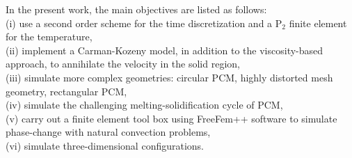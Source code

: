 In the present work, the main objectives are listed as follows:\\
(i) use a second order scheme for the time discretization and a P$_2$ finite element for the temperature,\\
(ii) implement a Carman-Kozeny model, in addition to the viscosity-based approach, to annihilate the velocity in the solid region,\\
(iii) simulate more complex geometries: circular PCM, highly distorted mesh geometry, rectangular PCM, \\
(iv) simulate the challenging melting-solidification cycle of PCM, \\
(v) carry out a finite element tool box using FreeFem++ software to simulate phase-change with natural convection problems, \\
(vi) simulate three-dimensional configurations.

